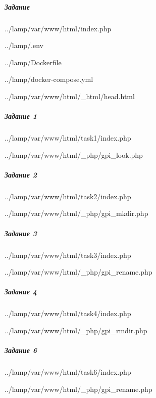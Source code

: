 \subparagraph{Задание} \hspace{0pt}


{../lamp/var/www/html/index.php}


{../lamp/.env}


{../lamp/Dockerfile}


{../lamp/docker-compose.yml}


{../lamp/var/www/html/_html/head.html}


\subparagraph{Задание 1} \hspace{0pt}


{../lamp/var/www/html/task1/index.php}


{../lamp/var/www/html/_php/gpi_look.php}


\subparagraph{Задание 2} \hspace{0pt}


{../lamp/var/www/html/task2/index.php}


{../lamp/var/www/html/_php/gpi_mkdir.php}


\subparagraph{Задание 3} \hspace{0pt}


{../lamp/var/www/html/task3/index.php}


{../lamp/var/www/html/_php/gpi_rename.php}


\subparagraph{Задание 4} \hspace{0pt}


{../lamp/var/www/html/task4/index.php}


{../lamp/var/www/html/_php/gpi_rmdir.php}


\subparagraph{Задание 6} \hspace{0pt}


{../lamp/var/www/html/task6/index.php}


{../lamp/var/www/html/_php/gpi_rename.php}

